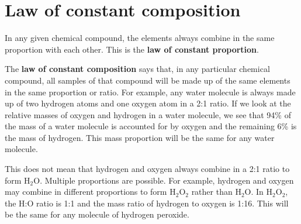             \section{Law of constant composition}
            \nopagebreak
      \label{m38711*id65065}In any given chemical compound, the elements always combine in the same proportion with each other. This is the \textbf{law of constant proportion}.\par 
      \label{m38711*id65075}The \textbf{law of constant composition} says that, in any particular chemical compound, all samples of that compound will be made up of the same elements in the same proportion or ratio. For example, any water molecule is always made up of two hydrogen atoms and one oxygen atom in a 2:1 ratio. If we look at the relative masses of oxygen and hydrogen in a water molecule, we see that 94\% of the mass of a water molecule is accounted for by oxygen and the remaining 6\% is the mass of hydrogen. This mass proportion will be the same for any water molecule.\par 
      \label{m38711*id65089}This does not mean that hydrogen and oxygen always combine in a 2:1 ratio to form $\text{H}{}_{2}\text{O}$. Multiple proportions are possible. For example, hydrogen and oxygen may combine in different proportions to form $\text{H}{}_{2}\text{O}{}_{2}$ rather than $\text{H}{}_{2}\text{O}$. In $\text{H}{}_{2}\text{O}{}_{2}$, the H:O ratio is 1:1 and the mass ratio of hydrogen to oxygen is 1:16. This will be the same for any molecule of hydrogen peroxide.\par 
